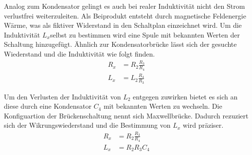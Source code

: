 Analog zum Kondensator gelingt es auch bei realer Induktivität nicht den Strom verlustfrei weiterzuleiten.
Als Beiprodukt entsteht durch magnetische Feldenergie Wärme, was als fiktiver Widerstand in den Schaltplan einzeichnet wird.
Um die Induktivität $L_x$selbst zu bestimmen wird eine Spule mit bekannten Werten der Schaltung hinzugefügt. 
Ähnlich zur Kondensatorbrücke lässt sich der gesuchte Wiederstand und die Induktivität wie folgt finden.
\begin{align}
    R_x &= R_2\frac{R_3}{R_4} \\
    L_x &= L_2\frac{R_4}{R_3}
\end{align}

Um den Verlusten der Induktivität von $L_2$ entgegen zuwirken bietet es sich an diese durch eine Kondensator $C_4$ mit bekannten Werten
zu wechseln. Die Konfiguartion der Brückenschaltung nennt sich Maxwellbrücke.
Dadurch rezuziert sich der Wikrungswiederstand und die Bestimmung von $L_x$ wird präziser.
\begin{align}
    R_x &= R_2\frac{R_3}{R_4} \\
    L_x &= R_2R_3C_4
\end{align}
\\
\newline
